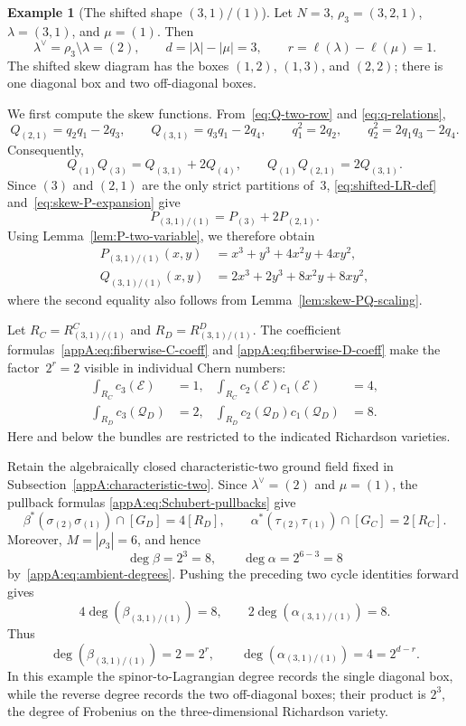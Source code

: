 \documentclass[11pt,a4paper,oneside]{amsart}
\numberwithin{equation}{section}
\theoremstyle{definition}
\newtheorem{example}[theorem]{Example}
\theoremstyle{remark}
\begin{document}
\begin{example}[The shifted shape $(3,1)/(1)$]
\label{appA:ex:31-over-1}
Let $N=3$, $\rho_3=(3,2,1)$, $\lambda=(3,1)$, and $\mu=(1)$.
Then
\[
 \lambda^\vee=\rho_3\setminus\lambda=(2),
 \qquad
 d=|\lambda|-|\mu|=3,
 \qquad
 r=\ell(\lambda)-\ell(\mu)=1.
\]
The shifted skew diagram has the boxes $(1,2)$, $(1,3)$, and $(2,2)$;
there is one diagonal box and two off-diagonal boxes.

We first compute the skew functions.  From~\eqref{eq:Q-two-row} and
\eqref{eq:q-relations},
\[
 Q_{(2,1)}=q_2q_1-2q_3,
 \qquad
 Q_{(3,1)}=q_3q_1-2q_4,
 \qquad
 q_1^2=2q_2,
 \qquad
 q_2^2=2q_1q_3-2q_4.
\]
Consequently,
\[
 Q_{(1)}Q_{(3)}=Q_{(3,1)}+2Q_{(4)},
 \qquad
 Q_{(1)}Q_{(2,1)}=2Q_{(3,1)}.
\]
Since $(3)$ and $(2,1)$ are the only strict partitions of~$3$,
\eqref{eq:shifted-LR-def} and~\eqref{eq:skew-P-expansion} give
\begin{equation}\label{appA:eq:example-skew-expansion}
 P_{(3,1)/(1)}=P_{(3)}+2P_{(2,1)}.
\end{equation}
Using Lemma~\ref{lem:P-two-variable}, we therefore obtain
\begin{align}
 P_{(3,1)/(1)}(x,y)
 &=x^3+y^3+4x^2y+4xy^2,
 \label{appA:eq:example-P}\\
 Q_{(3,1)/(1)}(x,y)
 &=2x^3+2y^3+8x^2y+8xy^2,
 \label{appA:eq:example-Q}
\end{align}
where the second equality also follows from
Lemma~\ref{lem:skew-PQ-scaling}.

Let $R_C=R^C_{(3,1)/(1)}$ and $R_D=R^D_{(3,1)/(1)}$.  The coefficient
formulas~\eqref{appA:eq:fiberwise-C-coeff} and
\eqref{appA:eq:fiberwise-D-coeff} make the factor~$2^r=2$ visible in
individual Chern numbers:
\begin{align*}
 \int_{R_C}c_3(\mathcal E)&=1,
 &\int_{R_C}c_2(\mathcal E)c_1(\mathcal E)&=4,\\
 \int_{R_D}c_3(\mathcal Q_D)&=2,
 &\int_{R_D}c_2(\mathcal Q_D)c_1(\mathcal Q_D)&=8.
\end{align*}
Here and below the bundles are restricted to the indicated Richardson
varieties.

Retain the algebraically closed characteristic-two ground field fixed in
Subsection~\ref{appA:characteristic-two}.  Since $\lambda^\vee=(2)$ and
$\mu=(1)$, the pullback formulas
\eqref{appA:eq:Schubert-pullbacks} give
\[
 \beta^*(\sigma_{(2)}\sigma_{(1)})\cap[G_D]=4[R_D],
 \qquad
 \alpha^*(\tau_{(2)}\tau_{(1)})\cap[G_C]=2[R_C].
\]
Moreover, $M=|\rho_3|=6$, and hence
\[
 \deg\beta=2^3=8,
 \qquad
 \deg\alpha=2^{6-3}=8
\]
by~\eqref{appA:eq:ambient-degrees}.  Pushing the preceding two cycle
identities forward gives
\[
 4\deg(\beta_{(3,1)/(1)})=8,
 \qquad
 2\deg(\alpha_{(3,1)/(1)})=8.
\]
Thus
\[
 \deg(\beta_{(3,1)/(1)})=2=2^r,
 \qquad
 \deg(\alpha_{(3,1)/(1)})=4=2^{d-r}.
\]
In this example the spinor-to-Lagrangian degree records the single diagonal
box, while the reverse degree records the two off-diagonal boxes; their
product is $2^3$, the degree of Frobenius on the three-dimensional
Richardson variety.
\end{example}
\end{document}

